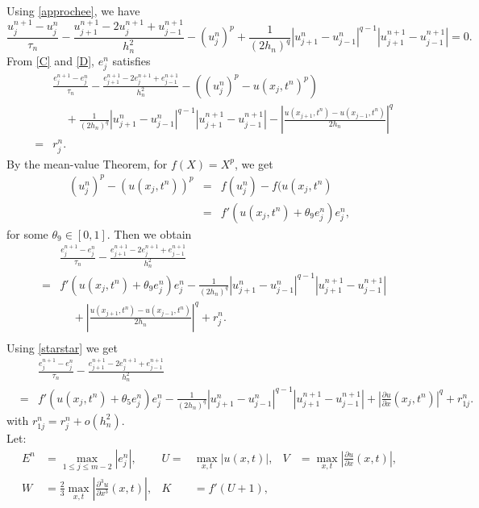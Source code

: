 \documentclass[a4paper,12pt,english,reqno]{smfart}
\begin{document}
	Using \eqref{approchee}, we have 
	\begin{equation}
	\frac{u_{j}^{n+1}-u_{j}^{n}}{\tau_{n}}-\frac{u_{j+1}^{n+1}-2u_{j}^{n+1}+u_{j-1}^{n+1}}{h_{n}^{2}}-(u_{j}^{n})^{p}+\frac{1}{(2h_{n})^{q}}|u_{j+1}^{n}-u_{j-1}^{n}|^{q-1}|u_{j+1}^{n+1}-u_{j-1}^{n+1}|=0.
	\label{D}
	\end{equation}
	From \eqref{C} and \eqref{D}, $e_{j}^{n}$ satisfies
	\begin{eqnarray*}
		&&\frac{e_{j}^{n+1}-e_{j}^{n}}{\tau_{n}}-\frac{e_{j+1}^{n+1}-2e_{j}^{n+1}+e_{j-1}^{n+1}}{h_{n}^{2}}-\left((u_{j}^{n})^{p}-u(x_{j},t^{n})^{p}\right)\\
		&&\ \ \ \ \ +\frac{1}{(2h_{n})^{q}}|u_{j+1}^{n}-u_{j-1}^{n}|^{q-1}|u_{j+1}^{n+1}-u_{j-1}^{n+1}|
		-\left|\frac{u(x_{j+1},t^{n})-u(x_{j-1},t^{n})}{2h_{n}}\right|^{q}\\
		&=& r_{j}^{n}.
	\end{eqnarray*}
	By the mean-value Theorem, for $f(X)=X^{p}$, we get
	\begin{eqnarray*}
		(u_{j}^{n})^{p}-(u(x_{j},t^{n}))^{p}&=&f(u_{j}^{n})-f(u(x_{j},t^{n})\\
		&=&f'(u(x_{j},t^{n})+\theta_{9}e_{j}^{n})e_{j}^{n},
	\end{eqnarray*}
	for some $\theta_{9}\in [0,1]$. Then we obtain
	\begin{eqnarray*}
		&&\frac{e_{j}^{n+1}-e_{j}^{n}}{\tau_{n}}-\frac{e_{j+1}^{n+1}-2e_{j}^{n+1}+e_{j-1}^{n+1}}{h_{n}^{2}}\\
		&=&f'(u(x_{j},t^{n})+\theta_{9}e_{j}^{n})e_{j}^{n}-\frac{1}{(2h_{n})^{q}}|u_{j+1}^{n}-u_{j-1}^{n}|^{q-1}|u_{j+1}^{n+1}-u_{j-1}^{n+1}|\\
		&&\ \ \ \ \ +\left|\frac{u(x_{j+1},t^{n})-u(x_{j-1},t^{n})}{2h_{n}}\right|^{q}+r_{j}^{n}.\\
	\end{eqnarray*}
	Using \eqref{starstar} we get
	\begin{eqnarray*}
		&&\frac{e_{j}^{n+1}-e_{j}^{n}}{\tau_{n}}-\frac{e_{j+1}^{n+1}-2e_{j}^{n+1}+e_{j-1}^{n+1}}{h_{n}^{2}}\\
		&=&f'(u(x_{j},t^{n})+\theta_{5}e_{j}^{n})e_{j}^{n}-\frac{1}{(2h_{n})^{q}}|u_{j+1}^{n}-u_{j-1}^{n}|^{q-1}|u_{j+1}^{n+1}-u_{j-1}^{n+1}|+\left|\frac{\partial u}{\partial x}(x_{j},t^{n})\right|^{q}+r_{1j}^{n}.
	\end{eqnarray*}
	with $r_{1j}^{n}=r_{j}^{n}+o(h_{n}^{2}).$\\
	Let:
	\begin{align*}
	E^{n}&=\max_{1\leq j \leq m-2}\left|e_{j}^{n}\right|, & U=&\max_{x,t}\left|u(x,t)\right|,	& V&=\max_{x,t}\left|\frac{\partial u}{\partial x}(x,t)\right|, \\ W&=\frac{2}{3}\max_{x,t}\left|\frac{\partial^{3} u}{\partial x^{3}}(x,t)\right|,
	& K&=f'(U+1),
	\end{align*}
\end{document}
